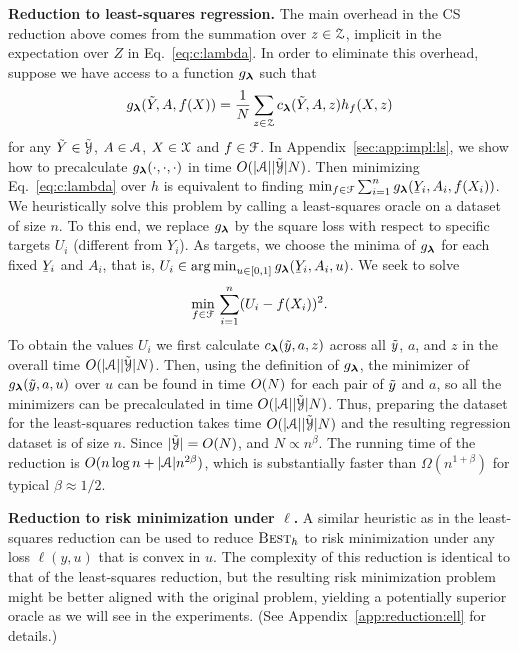 \documentclass{article}
\begin{document}
\textbf{Reduction to least-squares regression.}
The main overhead in the CS reduction above comes from the summation over $z\in\mathcal{Z}$, implicit in the expectation over $Z$ in Eq.~\eqref{eq:c:lambda}. In order to eliminate this overhead, suppose we have access to a function $g_{\boldsymbol{\lambda}}$
such that
\[%
g_{\vlambda}(\tY,A,f(X))
=
\frac{1}{N} \sum_{z \in \calZ} c_{\vlambda}(\tY, A, z) h_f(X,z)
\]
for any $\tilde{Y}\in\tilde{\mathcal{Y}}$, $A \in \mathcal{A}$, $X \in \mathcal{X}$ and $f\in\mathcal{F}$. In Appendix~\ref{sec:app:impl:ls}, we show how to precalculate $g_{\boldsymbol{\lambda}}(\cdot,\cdot,\cdot)$
in time $O(\lvert\mathcal{A}\rvert\lvert\tilde{\mathcal{Y}}\rvert N)$. Then minimizing Eq.~\eqref{eq:c:lambda} over $h$ is equivalent to finding $\min_{f \in \calF} \sum_{i=1}^n g_{\vlambda}(\underY_i,A_i,f(X_i))$. We heuristically solve this problem by calling a least-squares oracle on a dataset of size $n$. To this end, we replace $g_{\boldsymbol{\lambda}}$ by the square loss with respect to specific targets $U_i$ (different from $Y_i$). As targets, we choose the minima of $g_{\boldsymbol{\lambda}}$ for each fixed $\underY_i$ and $A_i$, that is, $U_i\in\argmin_{u\in[0,1]} g_{\vlambda}(\underY_i,A_i,u)$. We seek to solve
\[
  \min_{f \in \mathcal{F}}\,\sum_{i=1}^n (U_i-f(X_i))^2
.
\]
To obtain the values $U_i$ we first calculate $c_{\boldsymbol{\lambda}}(\tilde{y},a,z)$ across all $\tilde{y}$, $a$, and $z$
in the overall time $O(\lvert\mathcal{A}\rvert\lvert\tilde{\mathcal{Y}}\rvert N)$. Then, using the definition of $g_{\boldsymbol{\lambda}}$, the minimizer
of $g_{\boldsymbol{\lambda}}(\tilde{y},a,u)$ over $u$ can be found in time $O(N)$ for each pair of $\tilde{y}$ and $a$, so
all the minimizers can be precalculated in time $O(\lvert\mathcal{A}\rvert\lvert\tilde{\mathcal{Y}}\rvert N)$. Thus, preparing the dataset for
the least-squares reduction takes time $O(\lvert\mathcal{A}\rvert\lvert\tilde{\mathcal{Y}}\rvert N)$ and the resulting regression dataset
is of size $n$. Since $\lvert\tilde{\mathcal{Y}}\rvert=O(N)$, and $N\propto n^{\beta}$. The running time of the reduction is $O(n\log n + \lvert\mathcal{A}\rvert n^{2\beta})$, which is substantially faster than $\Omega(n^{1+\beta})$ for typical $\beta\approx 1/2$.

\textbf{Reduction to risk minimization under $\ell$.}
A similar heuristic as in the least-squares reduction can be used to reduce $\textsc{\mdseries Best}_h$ to risk minimization under any loss $\ell(y,u)$ that is convex in $u$. The complexity of this reduction is identical to that of the least-squares reduction, but the resulting risk minimization problem might be better aligned with the original problem, yielding a potentially superior oracle as we will see in the experiments. (See Appendix~\ref{app:reduction:ell} for details.)%
\end{document}
